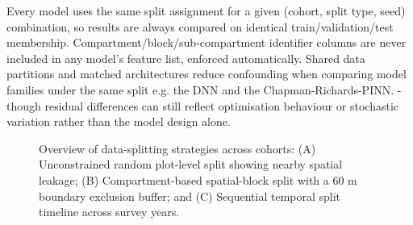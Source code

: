 \documentclass[11pt,a4paper]{report}
\begin{document}
Every model uses the same split assignment for a given (cohort, split type, seed) combination, so results are always compared on identical train/validation/test membership. Compartment/block/sub-compartment identifier columns are never included in any model's feature list, enforced automatically. Shared data partitions and matched architectures reduce confounding when comparing model families under the same split e.g. the DNN and the Chapman-Richards-PINN. - though residual differences can still reflect optimisation behaviour or stochastic variation rather than the model design alone. %


\begin{figure}[!htbp]
\centering
\begin{minipage}[b]{0.32\textwidth}
  \centering
\end{minipage}\hfill
\begin{minipage}[b]{0.32\textwidth}
  \centering
\end{minipage}\hfill
\begin{minipage}[b]{0.32\textwidth}
  \centering
\end{minipage}
\caption{Overview of data-splitting strategies across cohorts: (A) Unconstrained random plot-level split showing nearby spatial leakage; (B) Compartment-based spatial-block split with a $60\text{~m}$ boundary exclusion buffer; and (C) Sequential temporal split timeline across survey years.}
\label{fig:splits-combined}
\end{figure}
\end{document}
